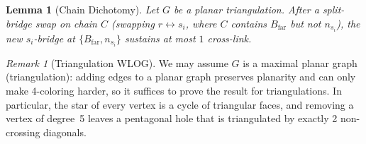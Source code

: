 \documentclass[11pt]{article}
\newtheorem{lemma}[theorem]{Lemma}
\theoremstyle{remark}
\newtheorem{remark}[theorem]{Remark}
\begin{document}
\begin{lemma}[Chain Dichotomy]
Let $G$ be a planar triangulation. After a split-bridge swap on chain $C$ (swapping $r \leftrightarrow s_i$, where $C$ contains $B_{\mathrm{far}}$ but not $n_{s_i}$), the new $s_i$-bridge at $\{B_{\mathrm{far}}, n_{s_i}\}$ sustains at most $1$ cross-link.
\end{lemma}

\begin{remark}[Triangulation WLOG]
We may assume $G$ is a maximal planar graph (triangulation): adding edges to a planar graph preserves planarity and can only make 4-coloring harder, so it suffices to prove the result for triangulations. In particular, the star of every vertex is a cycle of triangular faces, and removing a vertex of degree~5 leaves a pentagonal hole that is triangulated by exactly 2 non-crossing diagonals.
\end{remark}
\end{document}
